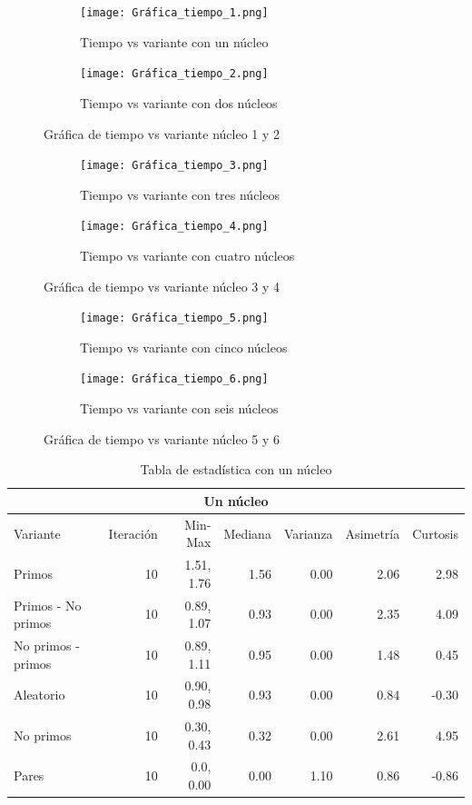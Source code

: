 \documentclass{article}
\begin{document}
\begin{figure}[H]
\centering
\begin{subfigure}[b]{0.45\linewidth}
\texttt{[image: Gráfica\_tiempo\_1.png]}
\caption{Tiempo vs variante con un núcleo}
\end{subfigure}
\begin{subfigure}[b]{0.45\linewidth}
\texttt{[image: Gráfica\_tiempo\_2.png]}
\caption{Tiempo vs variante con dos núcleos}
\end{subfigure}
\caption{Gráfica de tiempo vs variante núcleo 1 y 2}
\label{fig:westminster}
\end{figure}

\begin{figure}[H]
\centering
\begin{subfigure}[b]{0.45\linewidth}
\texttt{[image: Gráfica\_tiempo\_3.png]}
\caption{Tiempo vs variante con tres núcleos}
\end{subfigure}
\begin{subfigure}[b]{0.45\linewidth}
\texttt{[image: Gráfica\_tiempo\_4.png]}
\caption{Tiempo vs variante con cuatro núcleos}
\end{subfigure}
\caption{Gráfica de tiempo vs variante núcleo 3 y 4}
\label{fig:westminster}
\end{figure}

\begin{figure}[H]
\centering
\begin{subfigure}[b]{0.45\linewidth}
\texttt{[image: Gráfica\_tiempo\_5.png]}
\caption{Tiempo vs variante con cinco núcleos}
\end{subfigure}
\begin{subfigure}[b]{0.45\linewidth}
\texttt{[image: Gráfica\_tiempo\_6.png]}
\caption{Tiempo vs variante con seis núcleos}
\end{subfigure}
\caption{Gráfica de tiempo vs variante núcleo 5 y 6}
\label{fig:westminster}
\end{figure}

\begin{table}[H]
\centering
\begin{tabular}{|l | r | r | r | r | r | r|}
\hline
\multicolumn{7}{|c|}{Un núcleo}\\
\hline
Variante&Iteración&Min-Max&Mediana&Varianza&Asimetría&Curtosis\\
\hline
 Primos               & 10 & 1.51, 1.76   & 1.56 & 0.00 & 2.06& 2.98\\
 Primos - No primos   & 10 & 0.89, 1.07 & 0.93 & 0.00 & 2.35& 4.09\\
 No primos - primos   & 10 & 0.89, 1.11  & 0.95 & 0.00 & 1.48& 0.45\\
 Aleatorio            & 10 & 0.90, 0.98  & 0.93 & 0.00& 0.84& -0.30\\
 No primos            & 10 & 0.30, 0.43  & 0.32 & 0.00 & 2.61& 4.95\\
 Pares                & 10 & 0.0, 0.00  & 0.00 & 1.10 & 0.86& -0.86\\
\hline
\end{tabular}
\caption{Tabla de estadística con un núcleo}
\label{table:1}
\end{table}
\end{document}
